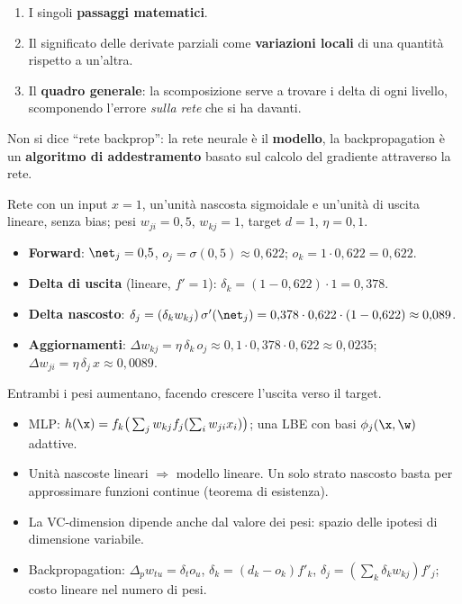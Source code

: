 \begin{idea}
\begin{enumerate}
  \item I singoli \textbf{passaggi matematici}.
  \item Il significato delle derivate parziali come \textbf{variazioni locali} di una quantità rispetto a
        un'altra.
  \item Il \textbf{quadro generale}: la scomposizione serve a trovare i delta di ogni livello, scomponendo
        l'errore \emph{sulla rete} che si ha davanti.
\end{enumerate}
\end{idea}

\begin{attenzione}[Terminologia]
Non si dice ``rete backprop'': la rete neurale è il \textbf{modello}, la backpropagation è un \textbf{algoritmo di
addestramento} basato sul calcolo del gradiente attraverso la rete.
\end{attenzione}

\begin{esempio}
Rete con un input $x=1$, un'unità nascosta sigmoidale e un'unità di uscita lineare, senza bias; pesi
$w_{ji}=0{,}5$, $w_{kj}=1$, target $d=1$, $\eta=0{,}1$.
\begin{itemize}
  \item \textbf{Forward}: $\net_j=0{,}5$, $o_j = \sigma(0{,}5)\approx0{,}622$; $o_k = 1\cdot0{,}622 = 0{,}622$.
  \item \textbf{Delta di uscita} (lineare, $f'=1$): $\delta_k = (1-0{,}622)\cdot1 = 0{,}378$.
  \item \textbf{Delta nascosto}: $\delta_j = (\delta_kw_{kj})\,\sigma'(\net_j) = 0{,}378\cdot0{,}622\cdot(1-0{,}622)\approx0{,}089$.
  \item \textbf{Aggiornamenti}: $\Delta w_{kj} = \eta\,\delta_k\,o_j\approx0{,}1\cdot0{,}378\cdot0{,}622\approx0{,}0235$;
        $\Delta w_{ji} = \eta\,\delta_j\,x\approx0{,}0089$.
\end{itemize}
Entrambi i pesi aumentano, facendo crescere l'uscita verso il target.
\end{esempio}

\begin{puntichiave}
\begin{itemize}
  \item MLP: $h(\x) = f_k\big(\sum_jw_{kj}f_j(\sum_iw_{ji}x_i)\big)$; una LBE con basi $\phi_j(\x,\w)$ adattive.
  \item Unità nascoste lineari $\Rightarrow$ modello lineare. Un solo strato nascosto basta per approssimare
        funzioni continue (teorema di esistenza).
  \item La VC-dimension dipende anche dal valore dei pesi: spazio delle ipotesi di dimensione variabile.
  \item Backpropagation: $\Delta_pw_{tu} = \delta_to_u$, $\delta_k = (d_k-o_k)f'_k$,
        $\delta_j = (\sum_k\delta_kw_{kj})f'_j$; costo lineare nel numero di pesi.
\end{itemize}
\end{puntichiave}

